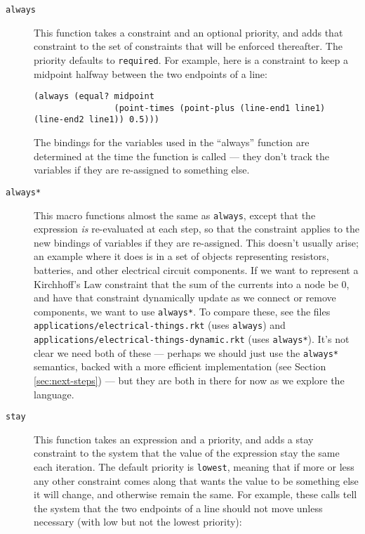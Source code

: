 \documentclass{article}
\begin{document}
\begin{description}

\item[{\tt always}] This function takes a constraint and an optional
  priority, and adds that constraint to the set of constraints that will be
  enforced thereafter.  The priority defaults to {\tt required}.  For
  example, here is a constraint to keep a midpoint halfway between the two
  endpoints of a line:

\begin{verbatim}
(always (equal? midpoint 
                (point-times (point-plus (line-end1 line1) (line-end2 line1)) 0.5)))
\end{verbatim}

The bindings for the variables used in the ``always'' function are
determined at the time the function is called --- they don't track the
variables if they are re-assigned to something else.

\item[{\tt always*}] This macro functions almost the same as
  \verb|always|, except that the expression \emph{is} re-evaluated at
  each step, so that the constraint applies to the new bindings of
  variables if they are re-assigned.  This doesn't usually arise; an
  example where it does is in a set of objects representing resistors,
  batteries, and other electrical circuit components.  If we want to
  represent a Kirchhoff's Law constraint that the sum of the currents
  into a node be 0, and have that constraint dynamically update as we
  connect or remove components, we want to use \verb|always*|.  To
  compare these, see the files
  \verb|applications/electrical-things.rkt| (uses \verb|always|) and
  \verb|applications/electrical-things-dynamic.rkt| (uses
  \verb|always*|).  It's not clear we need both of these --- perhaps
  we should just use the \verb|always*| semantics, backed with a more
  efficient implementation (see Section \ref{sec:next-steps}) --- but
  they are both in there for now as we explore the language.

\item[{\tt stay}] This function takes an expression and a priority,
  and adds a stay constraint to the system that the value of the
  expression stay the same each iteration.  The default priority is
  {\tt lowest}, meaning that if more or less any other constraint
  comes along that wants the value to be something else it will
  change, and otherwise remain the same.  For example, these calls
  tell the system that the two endpoints of a line should not move
  unless necessary (with low but not the lowest priority):


\end{description}
\end{document}
